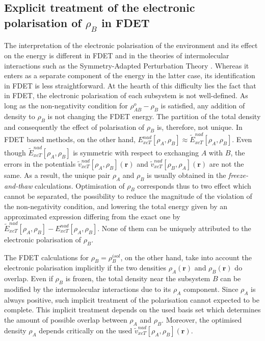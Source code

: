 \documentclass[journal=jctcce,manuscript=article]{achemso}
\begin{document}
\subsection{Explicit treatment of the electronic polarisation of $\rho_B$ in FDET}\label{sect:pol_treat}
The interpretation of the electronic polarisation of the environment and its effect on the energy is different in FDET and in the theories of intermolecular interactions such as the Symmetry-Adapted Perturbation Theory \cite{Jeziorski1994}. Whereas it enters as a separate component of the energy in the latter case, its identification in FDET is less straightforward.
At the hearth of this difficulty lies the fact that in FDET, the electronic polarisation of each subsystem is not well-defined. As long as the non-negativity condition for $\rho^{o}_{AB}-\rho_B$ is satisfied, any addition of density to $\rho_B$ is not changing the FDET energy. The partition of the total density and consequently the effect of polarisation of $\rho_B$
is, therefore, not unique. 
In FDET based methods, on the other hand,  ${E}_{xcT}^{nad}[\rho_A,\rho_B]\approx \tilde{E}_{xcT}^{nad}[\rho_A,\rho_B]$. 
Even though $\tilde{E}_{xcT}^{nad}[\rho_A,\rho_B]$
is symmetric with respect to exchanging $A$ with $B$, 
the errors in the potentials  $\tilde{v}_{xcT}^{nad}[\rho_A,\rho_B](\mathbf{r})$ and  $\tilde{v}_{xcT}^{nad}[\rho_B,\rho_A](\mathbf{r})$
 are not the same. 
As a result, the unique pair $\rho_A$ and  $\rho_B$ is usually obtained in the \textit{freeze-and-thaw} calculations. 
Optimisation of $\rho_B$  corresponds thus to two effect which cannot be separated, the possibility to reduce the magnitude of the violation of the non-negativity condition, and lowering the total energy given by an approximated expression differing from the exact one by  $\tilde{E}_{xcT}^{nad}[\rho_A,\rho_B]-{E}_{xcT}^{nad}[\rho_A,\rho_B]$. None of them can be uniquely attributed to the electronic polarisation of $\rho_B$. 

The FDET calculations for $\rho_B=\rho_B^{isol}$, on the other hand, take into account the electronic polarisation implicitly if the two densities $\rho_A(\mathbf{r})$ and $\rho_B(\mathbf{r})$ do overlap. 
Even if $\rho_B$ is frozen, the total density near the subsystem $B$ can be modified by the intermolecular interactions due to its $\rho_A$ component.  Since $\rho_A$
is always positive, such implicit treatment of the polarisation cannot expected to be complete. 
This implicit treatment depends on the used basis set which determines the amount of possible overlap between  $\rho_A$ and $\rho_B$.
Moreover, the optimised density 
$\rho_A$ depends critically on the used $\tilde{v}_{xcT}^{nad}[\rho_A,\rho_B](\mathbf{r})$.  
\end{document}
